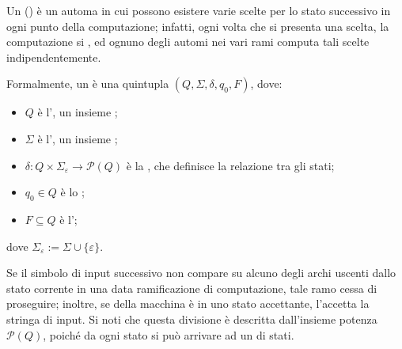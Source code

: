 \documentclass[a4paper, 12pt]{report}
\begin{document}
    \begin{frameddefn}{\NFA}
        Un \tbf{\NFA} () è un automa in cui possono esistere varie scelte per lo stato successivo in ogni punto della computazione; infatti, ogni volta che si presenta una scelta, la computazione si , ed ognuno degli automi nei vari rami computa tali scelte indipendentemente.

        Formalmente, un \NFA è una quintupla $(Q, \Sigma, \delta, q_0, F)$, dove:

        \begin{itemize}
            \item $Q$ è l', un insieme ;
            \item $\Sigma$ è l', un insieme ;
            \item $\delta: Q \times \Sigma_{\varepsilon} \rightarrow \mathcal{P}(Q)$ è la , che definisce la relazione tra gli stati;
            \item $q_0 \in Q$ è lo ;
            \item $F \subseteq Q$ è l';
        \end{itemize}

        dove $\Sigma_{\varepsilon} := \Sigma \cup \{\varepsilon\}$.

        Se il simbolo di input successivo non compare su alcuno degli archi uscenti dallo stato corrente in una data ramificazione di computazione, tale ramo cessa di proseguire; inoltre, se  della macchina è in uno stato accettante, l'\NFA accetta la stringa di input. Si noti che questa divisione è descritta dall'insieme potenza $\mathcal{P}(Q)$, poiché da ogni stato si può arrivare ad un  di stati.
    \end{frameddefn}
\end{document}
